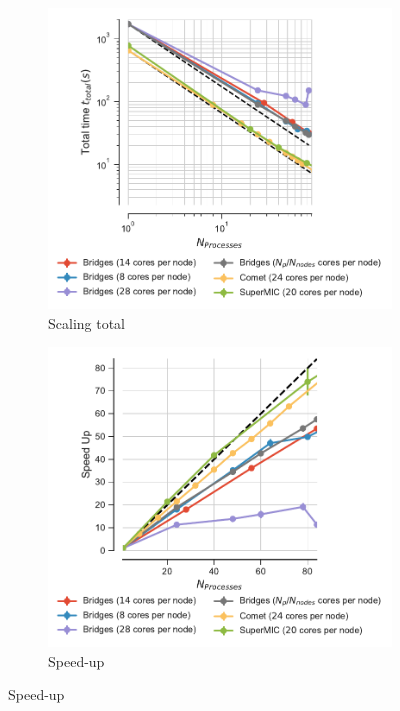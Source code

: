 \begin{figure}[ht!]
\centering
\begin{subfigure}{.4\textwidth}
  \includegraphics[width=\linewidth]{figures/Comparison_t-tot-clusters.pdf}
  \caption{Scaling total}
  \label{fig:MPIscaling-clusters}
\end{subfigure}
\hfill
\begin{subfigure}{.4\textwidth}
  \includegraphics[width=\linewidth]{figures/Comparison_speed-up-clusters.pdf}
  \caption{Speed-up}
  \label{fig:MPIspeedup-clusters}
\end{subfigure}
\bigskip


\end{figure}
